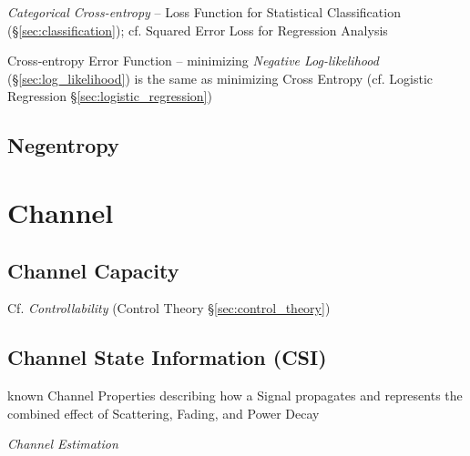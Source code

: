 \emph{Categorical Cross-entropy} -- Loss Function for Statistical Classification
(\S\ref{sec:classification}); cf. Squared Error Loss for Regression Analysis

\fist Cross-entropy Error Function -- minimizing \emph{Negative Log-likelihood}
(\S\ref{sec:log_likelihood}) is the same as minimizing Cross Entropy (cf.
Logistic Regression \S\ref{sec:logistic_regression})



\subsection{Negentropy}\label{sec:negentropy}



\section{Channel}\label{sec:channel}

\subsection{Channel Capacity}\label{sec:channel_capacity}

\fist Cf. \emph{Controllability} (Control Theory
\S\ref{sec:control_theory})



\subsection{Channel State Information (CSI)}\label{sec:csi}

known Channel Properties describing how a Signal propagates and represents the
combined effect of Scattering, Fading, and Power Decay

\emph{Channel Estimation}



